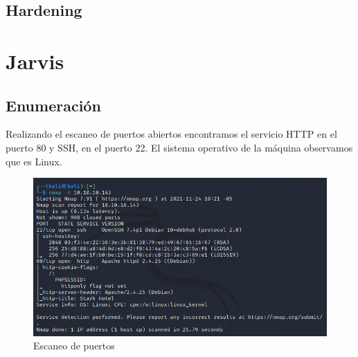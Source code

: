 \documentclass{article}
\begin{document}
\subsection{Hardening}

\clearpage 
\section{Jarvis}
\subsection{Enumeración}
Realizando el escaneo de puertos abiertos encontramos el servicio HTTP en el puerto 80 y SSH, en el puerto 22. El sistema operativo de la máquina observamos que es Linux.
\begin{figure}[H]
	\center
	\includegraphics[width=\textwidth]{images/jarvis/1.png}
	\caption{Escaneo de puertos}
\end{figure}
\end{document}
